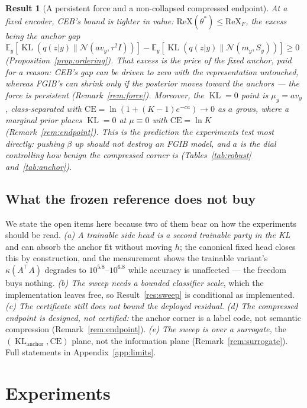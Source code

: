 \documentclass{article} %
\newtheorem{result}{Result}   %
\newcommand{\KLd}{\operatorname{KL}}
\newcommand{\ReX}{\mathrm{ReX}}
\newcommand{\CE}{\mathrm{CE}}
\newcommand{\Ncal}{\mathcal{N}}
\begin{document}
\begin{result}[A persistent force and a non-collapsed compressed endpoint]
\label{res:endpoint}
At a fixed encoder, CEB's bound is tighter in value: $\ReX(\theta^*) \le \ReX_F$, the
excess being the anchor gap $\mathbb{E}_y[\KLd(q(z|y)\|\Ncal(a v_y, \tau^2 I))] -
\mathbb{E}_y[\KLd(q(z|y)\|\Ncal(m_y,S_y))] \ge 0$
(Proposition~\ref{prop:ordering}). That excess is the price of the fixed anchor, paid
for a reason: CEB's gap can be driven to zero with the representation untouched,
whereas FGIB's can shrink only if the posterior moves toward the anchors --- the force
is persistent (Remark~\ref{rem:force}). Moreover, the $\KLd = 0$ point is
$\mu_y = a v_y$, class-separated with $\CE = \ln(1+(K{-}1)e^{-ca}) \to 0$ as $a$
grows, where a marginal prior places $\KLd = 0$ at $\mu \equiv 0$ with $\CE = \ln K$
(Remark~\ref{rem:endpoint}). This is the prediction the experiments test most
directly: pushing $\beta$ up should not destroy an FGIB model, and $a$ is the dial
controlling how benign the compressed corner is
(Tables~\ref{tab:robust} and~\ref{tab:anchor}).
\end{result}

\subsection{What the frozen reference does not buy}
\label{sec:limits-main}

We state the open items here because two of them bear on how the experiments should be
read. \emph{(a) A trainable side head is a second trainable party in the KL} and can
absorb the anchor fit without moving $h$; the canonical fixed head closes this by
construction, and the measurement shows the trainable variant's $\kappa(A^{\top}A)$
degrades to $10^{5.8}$--$10^{6.8}$ while accuracy is unaffected --- the freedom buys
nothing. \emph{(b) The sweep needs a bounded classifier scale}, which the implementation
leaves free, so Result~\ref{res:sweep} is conditional as implemented. \emph{(c) The
certificate still does not bound the deployed residual.} \emph{(d) The compressed
endpoint is designed, not certified:} the anchor corner is a label code, not semantic
compression (Remark~\ref{rem:endpoint}). \emph{(e) The sweep is over a surrogate,} the
$(\KLd_{\mathrm{anchor}},\CE)$ plane, not the information plane
(Remark~\ref{rem:surrogate}). Full statements in Appendix~\ref{app:limits}.

\section{Experiments}
\label{sec:exp}
\end{document}
